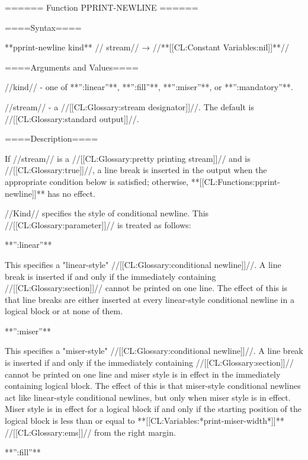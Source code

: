 ====== Function PPRINT-NEWLINE ======

====Syntax====

**pprint-newline {kind** //\opt} stream// → //**[[CL:Constant Variables:nil]]**//

====Arguments and Values====

//kind// - one of **'':linear''**, **'':fill''**, **'':miser''**, or **'':mandatory''**.

//stream// - a //[[CL:Glossary:stream designator]]//. The default is //[[CL:Glossary:standard output]]//.

====Description====

If //stream// is a //[[CL:Glossary:pretty printing stream]]// and  is //[[CL:Glossary:true]]//, a line break is inserted in the output when the appropriate condition below is satisfied; otherwise, **[[CL:Functions:pprint-newline]]** has no effect.

//Kind// specifies the style of conditional newline. This //[[CL:Glossary:parameter]]// is treated as follows:

\beginlist

\item{**'':linear''**}

This specifies a "linear-style" //[[CL:Glossary:conditional newline]]//. A line break is inserted if and only if the immediately containing //[[CL:Glossary:section]]// cannot be printed on one line. The effect of this is that line breaks are either inserted at every linear-style conditional newline in a logical block or at none of them.

\item{**'':miser''**}

This specifies a "miser-style" //[[CL:Glossary:conditional newline]]//. A line break is inserted if and only if the immediately containing //[[CL:Glossary:section]]// cannot be printed on one line and miser style is in effect in the immediately containing logical block. The effect of this is that miser-style conditional newlines act like linear-style conditional newlines, but only when miser style is in effect. Miser style is in effect for a logical block if and only if the starting position of the logical block is less than or equal to **[[CL:Variables:*print-miser-width*]]** //[[CL:Glossary:ems]]// from the right margin.

\item{**'':fill''**}

